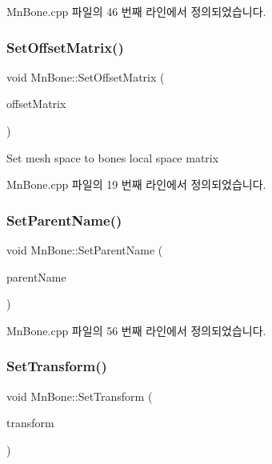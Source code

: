 Mn\+Bone.\+cpp 파일의 46 번째 라인에서 정의되었습니다.

\mbox{\label{class_m_n_l_1_1_mn_bone_a523fe1078ba5b534b316d38748cb2625}} 
\subsubsection{\texorpdfstring{Set\+Offset\+Matrix()}{SetOffsetMatrix()}}
{\footnotesize\ttfamily void Mn\+Bone\+::\+Set\+Offset\+Matrix (\begin{DoxyParamCaption}\item[{const Direct\+X\+::\+Simple\+Math\+::\+Matrix \&}]{offset\+Matrix }\end{DoxyParamCaption})}

Set mesh space to bone\textquotesingle{}s local space matrix 

Mn\+Bone.\+cpp 파일의 19 번째 라인에서 정의되었습니다.

\mbox{\label{class_m_n_l_1_1_mn_bone_a7be990cbdf3f123a6649b8de9968ac0f}} 
\subsubsection{\texorpdfstring{Set\+Parent\+Name()}{SetParentName()}}
{\footnotesize\ttfamily void Mn\+Bone\+::\+Set\+Parent\+Name (\begin{DoxyParamCaption}\item[{const std\+::string \&}]{parent\+Name }\end{DoxyParamCaption})}



Mn\+Bone.\+cpp 파일의 56 번째 라인에서 정의되었습니다.

\mbox{\label{class_m_n_l_1_1_mn_bone_a23ab583dd181a53935357ec51e376d9a}} 
\subsubsection{\texorpdfstring{Set\+Transform()}{SetTransform()}\hspace{0.1cm}{\footnotesize\ttfamily [1/2]}}
{\footnotesize\ttfamily void Mn\+Bone\+::\+Set\+Transform (\begin{DoxyParamCaption}\item[{const Direct\+X\+::\+Simple\+Math\+::\+Matrix \&}]{transform }\end{DoxyParamCaption})}



